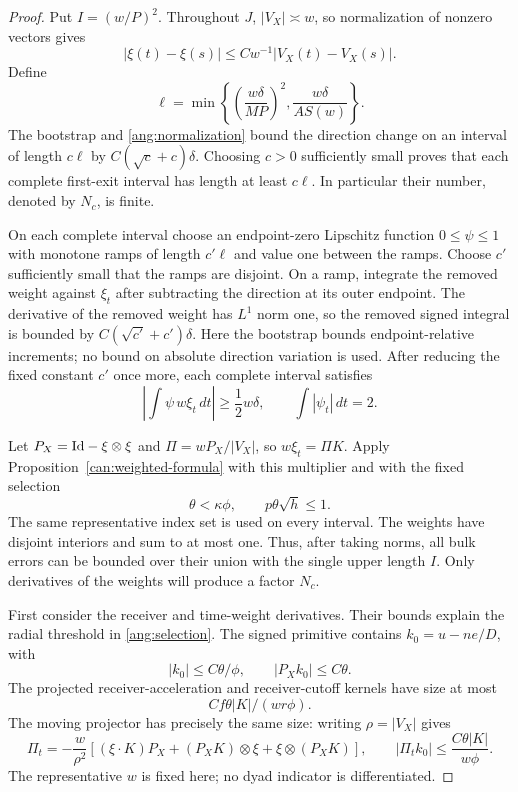 \begin{proof}
Put $I=(w/P)^2$. Throughout $J$, $|V_X|\asymp w$, so normalization of
nonzero vectors gives
\begin{equation}\label{ang:normalization}
 |\xi(t)-\xi(s)|\le Cw^{-1}|V_X(t)-V_X(s)|.
\end{equation}
Define
\[
 \ell=\min\left\{\left(\frac{w\delta}{MP}\right)^2,
                         \frac{w\delta}{AS(w)}\right\}.
\]
The bootstrap and \eqref{ang:normalization} bound the direction change
on an interval of length $c\ell$ by
$C(\sqrt c+c)\delta$. Choosing $c>0$ sufficiently small proves that
each complete first-exit interval has length at least $c\ell$.
In particular their number, denoted by $N_c$, is finite.

On each complete interval choose an endpoint-zero Lipschitz function
$0\le\psi\le1$ with monotone ramps of length $c'\ell$ and value one
between the ramps. Choose $c'$ sufficiently small that the ramps are
disjoint. On a ramp, integrate the removed weight against $\xi_t$ after
subtracting the direction at its outer endpoint. The derivative of the
removed weight has $L^1$ norm one, so the removed signed integral is bounded by
$C(\sqrt{c'}+c')\delta$. Here the bootstrap bounds endpoint-relative
increments; no bound on absolute direction variation is used.
After reducing the fixed constant $c'$ once more, each complete interval
satisfies
\begin{equation}\label{ang:weighted-exit}
 \left|\int\psi\,w\xi_t\,dt\right|\ge\frac12w\delta,
 \qquad \int|\psi_t|\,dt=2.
\end{equation}

Let $P_X=\mathrm{Id}-\xi\otimes\xi$ and
$\Pi=wP_X/|V_X|$, so $w\xi_t=\Pi K$.
Apply Proposition~\ref{can:weighted-formula}
with this multiplier and with the fixed selection
\begin{equation}\label{ang:selection}
 \theta<\kappa\phi,\qquad p\theta\sqrt h\le1.
\end{equation}
The same representative index set is used on every interval. The
weights have disjoint interiors and sum to at most one. Thus, after
taking norms, all bulk errors can be bounded over their union with
the single upper length $I$. Only derivatives of the weights will
produce a factor $N_c$.

First consider the receiver and time-weight derivatives. Their bounds
explain the radial threshold in \eqref{ang:selection}. The signed
primitive contains
$k_0=u-ne/D$, with
\[
 |k_0|\le C\theta/\phi,\qquad |P_Xk_0|\le C\theta.
\]
The projected receiver-acceleration and receiver-cutoff kernels have
size at most
\[ Cf\theta|K|/(wr\phi). \]
The moving projector has precisely
the same size: writing $\rho=|V_X|$ gives
\[
 \Pi_t=-\frac{w}{\rho^2}
 \left[(\xi\cdot K)P_X+(P_XK)\otimes\xi
                         +\xi\otimes(P_XK)\right],
 \qquad
 |\Pi_tk_0|\le\frac{C\theta|K|}{w\phi}.
\]
The representative $w$ is fixed here; no dyad indicator is differentiated.


\end{proof}
